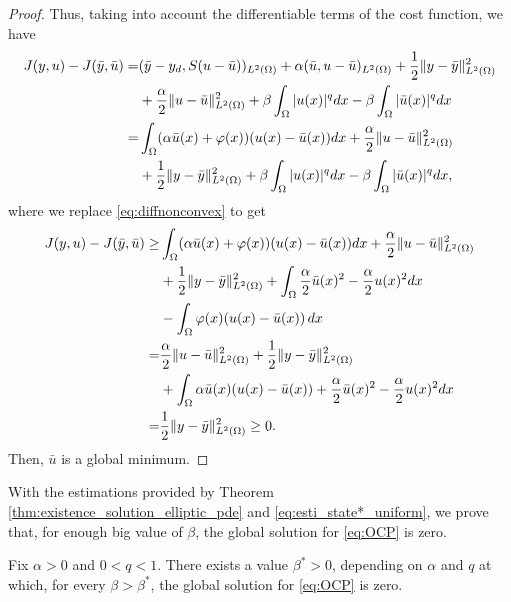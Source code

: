 \begin{proof}
  Thus, taking into account the differentiable terms of the cost function, we have		
		\begin{align}
			J(y,u) - J(\bar y,\bar u) = &(\bar y - y_d, S (u-\bar u))_{L^2(\Omega)} +\alpha(\bar u,u - \bar u)_{L^2(\Omega)} + \frac{1}{2}\lVert y -\bar y \rVert_{L^2(\Omega)}^2   \nonumber\\
			&+ \frac{\alpha}{2}\lVert u -\bar u \rVert_{L^2(\Omega)}^2+ \beta\int_\Omega |u(x)|^q dx - \beta\int_\Omega |\bar u(x)|^q dx\nonumber \\
			=&\int_\Omega (\alpha \bar u(x) + \varphi (x))(u(x)- \bar u(x)) dx + \frac{\alpha}{2}\lVert u -\bar u \rVert_{L^2(\Omega)}^2 \nonumber\\
			&+ \frac{1}{2}\lVert y -\bar y \rVert_{L^2(\Omega)}^2 + \beta\int_\Omega |u(x)|^q dx - \beta\int_\Omega |\bar u(x)|^q dx, \nonumber
		\end{align}
where we replace \eqref{eq:diffnonconvex} to get
  \begin{align}
			J(y,u) - J(\bar y,\bar u) \geq &\int_\Omega (\alpha \bar u(x) + \varphi (x))(u(x)- \bar u(x)) dx + \frac{\alpha}{2}\lVert u -\bar u \rVert_{L^2(\Omega)}^2 \nonumber\\
			&+ \frac{1}{2}\lVert y -\bar y \rVert_{L^2(\Omega)}^2 + \int_\Omega \frac{\alpha}{2} \bar u(x)^2 - \frac{\alpha}{2}   u(x)^2 dx \nonumber \\
   &- \int_\Omega \varphi(x) ( u(x)-\bar u(x)) \, dx \nonumber \\
   = &  \frac{\alpha}{2}\lVert u -\bar u \rVert_{L^2(\Omega)}^2 + \frac{1}{2}\lVert y -\bar y \rVert_{L^2(\Omega)}^2  \nonumber\\
   &+  \int_\Omega  \alpha \bar u(x)(u(x)- \bar u(x) ) +\frac{\alpha}{2} \bar u(x)^2 - \frac{\alpha}{2} u(x)^2 dx \nonumber \\
  =& \frac{1}{2}\lVert y -\bar y \rVert_{L^2(\Omega)}^2  \geq 0. \nonumber
		\end{align}
		Then, $\bar u$ is a global minimum.
	\end{proof}

	With the estimations provided by Theorem \ref{thm:existence_solution_elliptic_pde} and 
	\eqref{eq:esti_state*_uniform}, we prove that, for enough big value of $\beta$, the global
	solution for \eqref{eq:OCP} is zero.

	\begin{corollary}\label{corollary:null_solution}
		Fix $\alpha>0$ and $0<q<1$. There exists a value $\beta^*>0$, depending on $\alpha$ and $q$ at 
		which, for every $\beta>\beta^*$, the global solution for \eqref{eq:OCP} 
		is zero.
	\end{corollary}

